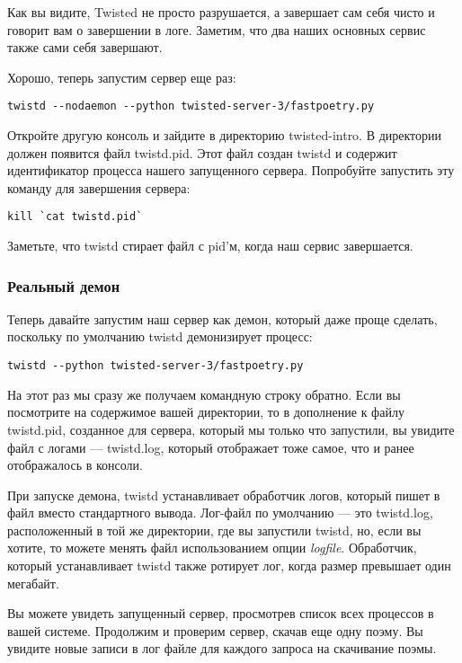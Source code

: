 Как вы видите, Twisted не просто разрушается, а завершает сам 
себя чисто и говорит вам о завершении в логе. Заметим, что два 
наших основных сервис также сами себя завершают.


Хорошо, теперь запустим сервер еще раз:

 \begin{verbatim}
twistd --nodaemon --python twisted-server-3/fastpoetry.py
\end{verbatim} 


Откройте другую консоль и зайдите в директорию twisted-intro. 
В директории должен появится файл twistd.pid. Этот файл создан 
twistd и содержит идентификатор процесса нашего запущенного 
сервера. Попробуйте запустить эту команду для завершения сервера: 

 \begin{verbatim}
kill `cat twistd.pid`
\end{verbatim} 

Заметьте, что twistd стирает файл с pid'м, когда наш сервис завершается.


\subsubsection{Реальный демон}


Теперь давайте запустим наш сервер как 
демон, который даже проще сделать, поскольку 
по умолчанию twistd демонизирует процесс:

 \begin{verbatim}
twistd --python twisted-server-3/fastpoetry.py
\end{verbatim} 


На этот раз мы сразу же получаем командную строку обратно. 
Если вы посмотрите на содержимое вашей директории, 
то в дополнение к файлу twistd.pid, созданное для сервера, 
который мы только что запустили, вы увидите файл с 
логами --- twistd.log, который отображает тоже самое, что и 
ранее отображалось в консоли.


При запуске демона, twistd устанавливает обработчик логов, 
который пишет в файл вместо стандартного вывода. Лог-файл 
по умолчанию --- это twistd.log, расположенный в той же 
директории, где вы запустили twistd, но, если вы хотите, то 
можете менять файл использованием опции \textit{logfile}. 
Обработчик, который устанавливает twistd также ротирует лог, 
когда размер превышает один мегабайт.


Вы можете увидеть запущенный сервер, просмотрев список 
всех процессов в вашей системе. Продолжим и проверим 
сервер, скачав еще одну поэму. Вы увидите новые записи 
в лог файле для каждого запроса на скачивание поэмы.


